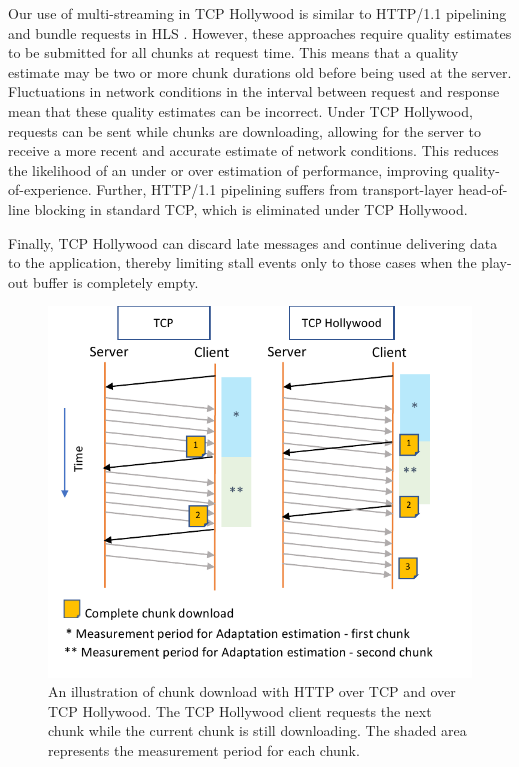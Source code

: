 Our use of multi-streaming in TCP Hollywood is similar to HTTP/1.1 pipelining and bundle
requests in HLS \cite{muller2012evaluation}. However, these approaches require quality
estimates to be submitted for all chunks at request time. This means that a quality
estimate may be two or more chunk durations old before being used at the server.
Fluctuations in network conditions in the interval between request and response mean that
these quality estimates can be incorrect. Under TCP Hollywood, requests can be sent while
chunks are downloading, allowing for the server to receive a more recent and accurate
estimate of network conditions. This reduces the likelihood of an under or over estimation
of performance, improving quality-of-experience. Further, HTTP/1.1 pipelining suffers
from transport-layer head-of-line blocking in standard TCP, which is eliminated under TCP Hollywood.

Finally, TCP Hollywood can discard late messages and continue delivering data to the application, thereby limiting stall events only to those cases when the play-out buffer is completely
empty.

\begin{figure}
    \centering
    \includegraphics[width=\columnwidth]{figures/tcph-download.pdf}
    \caption{An illustration of chunk download with HTTP over TCP and over TCP Hollywood. The TCP Hollywood client requests the next chunk while the current chunk is still downloading. The shaded area represents the measurement period for each chunk. }
    \label{fig:hollywood_download}
\end{figure}

